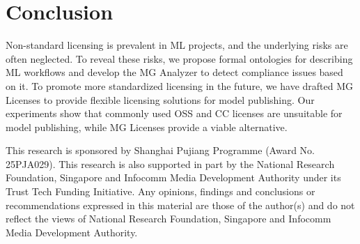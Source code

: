 \documentclass[sigconf]{acmart}
\begin{document}
\section{Conclusion}
\label{sec:conclusion}
Non-standard licensing is prevalent in ML projects, and the underlying risks are often neglected. 
To reveal these risks, we propose formal ontologies for describing ML workflows and develop the MG Analyzer to detect compliance issues based on it. 
To promote more standardized licensing in the future, we have drafted MG Licenses to provide flexible licensing solutions for model publishing. 
Our experiments show that commonly used OSS and CC licenses are unsuitable for model publishing, while MG Licenses provide a viable alternative.

\begin{acks}
This research is sponsored by Shanghai Pujiang Programme (Award No. 25PJA029).
This research is also supported in part by the National Research Foundation, Singapore and Infocomm Media Development Authority under its Trust Tech Funding Initiative. Any opinions, findings and conclusions or recommendations expressed in this material are those of the author(s) and do not reflect the views of National Research Foundation, Singapore and Infocomm Media Development Authority.
\end{acks}


\balance



\appendix
\balance

\end{document}
